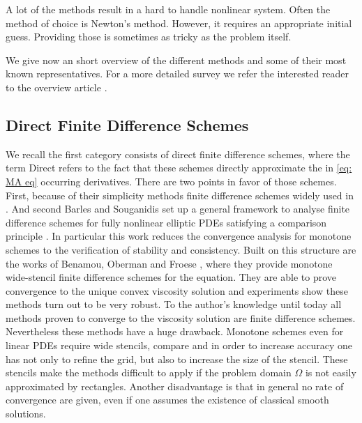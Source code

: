 A lot of the methods result in a hard to handle nonlinear system. Often the method of choice is Newton's method. However, it requires an appropriate initial guess. Providing those is sometimes as tricky as the problem itself.

We give now an short overview of the different methods and some of their most known representatives. For a more detailed survey we refer the interested reader to the overview article \cite{FGN2013}.


\subsection{Direct Finite Difference Schemes}

We recall the first category consists of direct finite difference schemes, where the term Direct refers to the fact that these schemes directly approximate the in \eqref{eq: MA eq} occurring derivatives. 
There are two points in favor of those schemes. First, because of their simplicity methods finite difference schemes widely used in .  And second Barles and Souganidis set up a general framework to analyse finite difference schemes for fully nonlinear elliptic PDEs satisfying a comparison principle \cite{BS1991}. In particular this work reduces the convergence analysis for monotone schemes to the verification of stability and consistency.
Built on this structure are the works of Benamou, Oberman and Froese \cite{BFO2010, Oberman2008, FO2011}, where they provide monotone wide-stencil finite difference schemes for the \MA equation.
They are able to prove convergence to the unique convex viscosity solution and experiments show these methods turn out to be very robust. To the author's knowledge until today all methods proven to converge to the viscosity solution are finite difference schemes.
Nevertheless these methods have a huge drawback. Monotone schemes even for linear PDEs require wide stencils, compare \cite{MW1953}  and in order to increase accuracy one has not only to refine the grid, but also to increase the size of the stencil. These stencils make the methods difficult to apply if the problem domain $\Omega$ is not easily approximated by rectangles. Another disadvantage is that in general no rate of convergence are given, even if one assumes the existence of classical smooth solutions.

